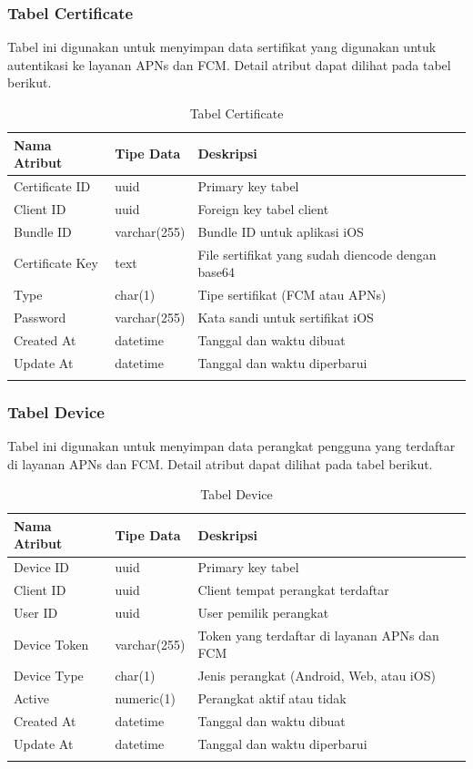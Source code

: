 \subsubsection{Tabel Certificate}
\par Tabel ini digunakan untuk menyimpan data sertifikat yang digunakan untuk autentikasi ke layanan APNs dan FCM. Detail atribut dapat dilihat pada tabel berikut.
\begin{longtable}{|p{2.5cm}|p{2cm}|p{4.5cm}|}
    \hline
    \textbf{Nama Atribut} & \textbf{Tipe Data} & \textbf{Deskripsi} \\ \hline
    Certificate ID & uuid & Primary key tabel \\ \hline
    Client ID & uuid & Foreign key tabel client \\ \hline
    Bundle ID & varchar(255) & Bundle ID untuk aplikasi iOS \\ \hline
    Certificate Key & text & File sertifikat yang sudah diencode dengan base64 \\ \hline
    Type & char(1) & Tipe sertifikat (FCM atau APNs) \\ \hline
    Password & varchar(255) & Kata sandi untuk sertifikat iOS \\ \hline
    Created At & datetime & Tanggal dan waktu dibuat \\ \hline
    Update At & datetime & Tanggal dan waktu diperbarui \\ \hline
    \caption{Tabel Certificate}
\end{longtable}

\subsubsection{Tabel Device}
\par Tabel ini digunakan untuk menyimpan data perangkat pengguna yang terdaftar di layanan APNs dan FCM. Detail atribut dapat dilihat pada tabel berikut.
\begin{longtable}{|p{2.5cm}|p{2cm}|p{4.5cm}|}
    \hline
    \textbf{Nama Atribut} & \textbf{Tipe Data} & \textbf{Deskripsi} \\ \hline
    Device ID & uuid & Primary key tabel \\ \hline
    Client ID & uuid & Client tempat perangkat terdaftar \\ \hline
    User ID & uuid & User pemilik perangkat \\ \hline
    Device Token & varchar(255) & Token yang terdaftar di layanan APNs dan FCM \\ \hline
    Device Type & char(1) & Jenis perangkat (Android, Web, atau iOS) \\ \hline
    Active & numeric(1) & Perangkat aktif atau tidak \\ \hline
    Created At & datetime & Tanggal dan waktu dibuat \\ \hline
    Update At & datetime & Tanggal dan waktu diperbarui \\ \hline
    \caption{Tabel Device}
\end{longtable}

